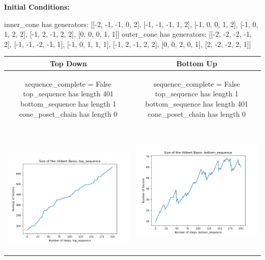 \documentclass[10pt]{article}
\begin{document}
\textbf{Initial Conditions:}
\begin{SAGE}
inner_cone has generators: 
[[-2, -1, -1, 0, 2], [-1, -1, -1, 1, 2], [-1, 0, 0, 1, 2], [-1, 0, 1, 2, 2], [-1, 2, -1, 2, 2], [0, 0, 0, 1, 1]]
outer_cone has generators: 
[[-2, -2, -2, -1, 2], [-1, -1, -2, -1, 1], [-1, 0, 1, 1, 1], [-1, 2, -1, 2, 2], [0, 0, 2, 0, 1], [2, -2, -2, 2, 1]]

\end{SAGE}
\begin{tabular}{c|c}
\textbf{Top Down} & \textbf{Bottom Up} \\ \hline  
\begin{SAGE}
	sequence_complete = False
	top_sequence has length 401
	bottom_sequence has length 1
	cone_poset_chain has length 0
\end{SAGE} 
&
\begin{SAGE}
	sequence_complete = False
	top_sequence has length 1
	bottom_sequence has length 401
	cone_poset_chain has length 0
\end{SAGE} 
\\ \hline
\
\begin{minipage}{.45\textwidth}
\includegraphics[width=\textwidth]{"DATA/5d/6 generators 2 bound C/top_sequence SIZE"}
\end{minipage} &
\begin{minipage}{.45\textwidth}
\includegraphics[width=\textwidth]{"DATA/5d/6 generators 2 bound C bottomup/bottom_sequence SIZE"}

\end{minipage}
\end{tabular}
\end{document}
